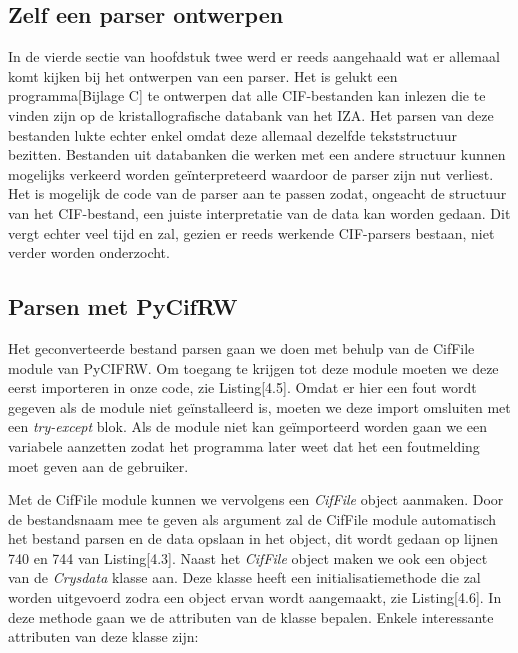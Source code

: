 \subsection{Zelf een parser ontwerpen}
In de vierde sectie van hoofdstuk twee werd er reeds aangehaald wat er allemaal komt kijken bij het ontwerpen van een parser. Het is gelukt een programma[Bijlage C] te ontwerpen dat alle CIF-bestanden kan inlezen die te vinden zijn op de kristallografische databank van het IZA.\citep*{IZA1} Het parsen van deze bestanden lukte echter enkel omdat deze allemaal dezelfde tekststructuur bezitten. Bestanden uit databanken die werken met een andere structuur kunnen mogelijks verkeerd worden geïnterpreteerd waardoor de parser zijn nut verliest. Het is mogelijk de code van de parser aan te passen zodat, ongeacht de structuur van het CIF-bestand, een juiste interpretatie van de data kan worden gedaan. Dit vergt echter veel tijd en zal, gezien er reeds werkende CIF-parsers bestaan, niet verder worden onderzocht.



\subsection{Parsen met PyCifRW}
Het geconverteerde bestand parsen gaan we doen met behulp van de CifFile module van PyCIFRW. Om toegang te krijgen tot deze module moeten we deze eerst importeren in onze code, zie Listing[4.5]. Omdat er hier een fout wordt gegeven als de module niet geïnstalleerd is, moeten we deze import omsluiten met een \textit{try-except} blok. Als de module niet kan geïmporteerd worden gaan we een variabele aanzetten zodat het programma later weet dat het een foutmelding moet geven aan de gebruiker.



Met de CifFile module kunnen we vervolgens een \textit{CifFile} object aanmaken. Door de bestandsnaam mee te geven als argument zal de CifFile module automatisch het bestand parsen en de data opslaan in het object, dit wordt gedaan op lijnen 740 en 744 van Listing[4.3]. Naast het \textit{CifFile} object maken we ook een object van de \textit{Crysdata} klasse aan. Deze klasse heeft een initialisatiemethode die zal worden uitgevoerd zodra een object ervan wordt aangemaakt, zie Listing[4.6]. In deze methode gaan we de attributen van de klasse bepalen. Enkele interessante attributen van deze klasse zijn:

